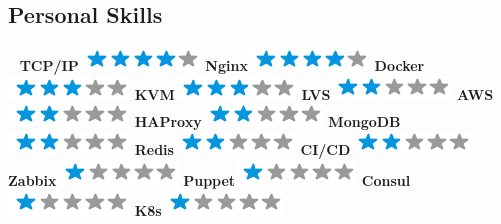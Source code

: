 \documentclass[]{friggeri-cv}
\begin{document}
\begin{aside}
  \section{Personal Skills}
  ~
  \textbf{TCP/IP}\includegraphics[scale=0.40]{img/4stars.png}
  \textbf{Nginx}\includegraphics[scale=0.40]{img/4stars.png}
  \textbf{Docker}\includegraphics[scale=0.40]{img/3stars.png}
  \textbf{KVM}\includegraphics[scale=0.40]{img/3stars.png}
  \textbf{LVS}\includegraphics[scale=0.40]{img/2stars.png}
  \textbf{AWS}\includegraphics[scale=0.40]{img/2stars.png}
  \textbf{HAProxy}\includegraphics[scale=0.40]{img/2stars.png}
  \textbf{MongoDB}\includegraphics[scale=0.40]{img/2stars.png}
  \textbf{Redis}\includegraphics[scale=0.40]{img/2stars.png}
  \textbf{CI/CD}\includegraphics[scale=0.40]{img/2stars.png}
  \textbf{Zabbix}\includegraphics[scale=0.40]{img/1stars.png}
  \textbf{Puppet}\includegraphics[scale=0.40]{img/1stars.png}
  \textbf{Consul}\includegraphics[scale=0.40]{img/1stars.png}
  \textbf{K8s}\includegraphics[scale=0.40]{img/1stars.png}
  ~
  ~
\end{aside}
\end{document}
